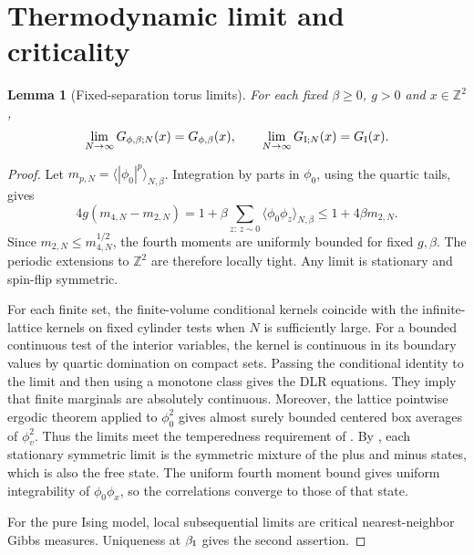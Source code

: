 \documentclass[11pt]{article}
\newtheorem{lemma}[proposition]{Lemma}
\theoremstyle{definition}
\begin{document}
\section{Thermodynamic limit and criticality}
\label{sec:criticality}

\begin{lemma}[Fixed-separation torus limits]\label{lem:thermodynamic-limits}
For each fixed \(\beta\ge0\), \(g>0\) and \(x\in\mathbb Z^2\),
\[
 \lim_{N\to\infty}G_{\phi,\beta;N}(x)=G_{\phi,\beta}(x),\qquad
 \lim_{N\to\infty}G_{{\rm I};N}(x)=G_{\rm I}(x).
\]
\end{lemma}

\begin{proof}
Let \(m_{p,N}=\langle|\phi_0|^p\rangle_{N,\beta}\). Integration by
parts in \(\phi_0\), using the quartic tails, gives
\[
 4g(m_{4,N}-m_{2,N})=
 1+\beta\sum_{z:\,z\sim0}\langle\phi_0\phi_z\rangle_{N,\beta}
 \le 1+4\beta m_{2,N}.
\]
Since \(m_{2,N}\le m_{4,N}^{1/2}\), the fourth moments are uniformly
bounded for fixed \(g,\beta\). The periodic extensions to \(\mathbb Z^2\)
are therefore locally tight. Any limit is stationary and spin-flip
symmetric.

For each finite set, the finite-volume conditional kernels coincide
with the infinite-lattice kernels on fixed cylinder tests when \(N\)
is sufficiently large. For a bounded continuous test of the interior
variables, the kernel is continuous in its boundary values by quartic
domination on compact sets. Passing the conditional identity to the
limit and then using a monotone class gives the DLR equations.
They imply that finite marginals are absolutely continuous. Moreover,
the lattice pointwise ergodic theorem applied to \(\phi_0^2\) gives
almost surely bounded centered box averages of \(\phi_v^2\).
Thus the limits meet the temperedness requirement of
\cite[Appendix D]{GPPSCurrents}. By
\cite[Theorem 1.2]{GPPSCurrents}, each stationary symmetric limit is the
symmetric mixture of the plus and minus states, which is also the
free state. The uniform fourth moment bound gives uniform
integrability of \(\phi_0\phi_x\), so the correlations converge to
those of that state.

For the pure Ising model, local subsequential limits are critical
nearest-neighbor Gibbs measures. Uniqueness at \(\beta_{\rm I}\)
\cite{DSTIsingUnique} gives the second assertion.
\end{proof}
\end{document}

